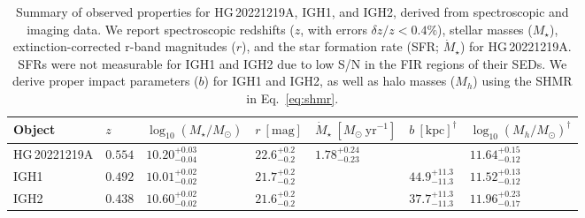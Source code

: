 \documentclass[twocolumn, linenumbers, tra]{aastex631}
\begin{document}
\begin{table*}
  \caption{Summary of observed properties for HG\,20221219A, IGH1, and IGH2, derived from spectroscopic and imaging data. We report spectroscopic redshifts ($z$, with errors $\delta z/z < 0.4\%$), stellar masses ($M_\star$), extinction-corrected r-band magnitudes ($r$), and the star formation rate (SFR; $\dot{M}_{\star}$) for HG\,20221219A. SFRs were not measurable for IGH1 and IGH2 due to low S/N in the FIR regions of their SEDs. We derive proper impact parameters ($b$) for IGH1 and IGH2, as well as halo masses ($M_h$) using the SHMR in Eq.~\ref{eq:shmr}.}
  \label{tab:hostintprops}
  \centering
  \begin{tabularx}{\textwidth}{@{\extracolsep{\fill}}XXXXXXX}
    \hline \hline
    Object & $z$ & \hspace{-0.75cm} $\log_{10}\left(M_{\star}/M_\odot\right)$ & $r\ \left[\mathrm{mag}\right]$ & \hspace{-0.5cm} $\dot{M}_{\star}\ \left[M_{\odot}\ \mathrm{yr}^{-1}\right]$ & \hspace{-0.2cm} $b\ \left[\mathrm{kpc}\right]^{\dagger}$ & \hspace{-0.5cm} $\log_{10}\left(M_{h}/M_\odot\right)^{\dagger}$ \\
    \hline
    HG\,20221219A & $0.554$ & \hspace{-0.75cm} $10.20_{-0.04}^{+0.03}$ & $22.6_{-0.2}^{+0.2}$ & \hspace{-0.5cm} $1.78_{-0.23}^{+0.24}$ & \hspace{-0.2cm} \text{...} & \hspace{-0.5cm} $11.64_{-0.12}^{+0.15}$\\
    IGH1 & $0.492$ & \hspace{-0.75cm} $10.01_{-0.02}^{+0.02}$ & $21.7_{-0.2}^{+0.2}$ & \hspace{-0.5cm} \text{...} & \hspace{-0.2cm} $44.9_{-11.3}^{+11.3}$ & \hspace{-0.5cm} $11.52_{-0.12}^{+0.13}$ \\
    IGH2 & $0.438$ & \hspace{-0.75cm} $10.60_{-0.02}^{+0.02}$ & $21.6_{-0.2}^{+0.2}$ & \hspace{-0.5cm} \text{...} & \hspace{-0.2cm} $37.7_{-11.3}^{+11.3}$ & \hspace{-0.5cm} $11.96_{-0.17}^{+0.23}$ \\
    \hline
  \end{tabularx}
\end{table*}
\end{document}
